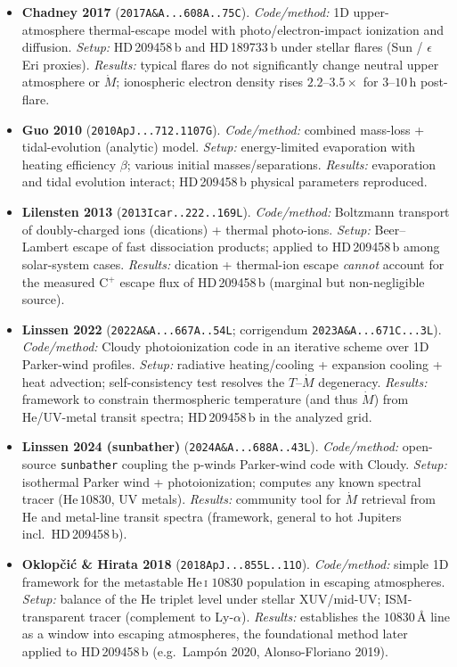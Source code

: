 \begin{itemize}
\item \textbf{Chadney 2017} (\texttt{2017A\&A...608A..75C}).
\emph{Code/method:} 1D upper-atmosphere thermal-escape model with photo/electron-impact ionization and diffusion.
\emph{Setup:} HD\,209458\,b and HD\,189733\,b under stellar flares (Sun / $\epsilon$\,Eri proxies).
\emph{Results:} typical flares do not significantly change neutral upper atmosphere or $\dot M$; ionospheric electron density rises $2.2$--$3.5\times$ for $3$--$10$\,h post-flare.

\item \textbf{Guo 2010} (\texttt{2010ApJ...712.1107G}).
\emph{Code/method:} combined mass-loss + tidal-evolution (analytic) model.
\emph{Setup:} energy-limited evaporation with heating efficiency $\beta$; various initial masses/separations.
\emph{Results:} evaporation and tidal evolution interact; HD\,209458\,b physical parameters reproduced.

\item \textbf{Lilensten 2013} (\texttt{2013Icar..222..169L}).
\emph{Code/method:} Boltzmann transport of doubly-charged ions (dications) + thermal photo-ions.
\emph{Setup:} Beer--Lambert escape of fast dissociation products; applied to HD\,209458\,b among solar-system cases.
\emph{Results:} dication + thermal-ion escape \emph{cannot} account for the measured C$^+$ escape flux of HD\,209458\,b (marginal but non-negligible source).

\item \textbf{Linssen 2022} (\texttt{2022A\&A...667A..54L}; corrigendum \texttt{2023A\&A...671C...3L}).
\emph{Code/method:} Cloudy photoionization code in an iterative scheme over 1D Parker-wind profiles.
\emph{Setup:} radiative heating/cooling + expansion cooling + heat advection; self-consistency test resolves the $T$--$\dot M$ degeneracy.
\emph{Results:} framework to constrain thermospheric temperature (and thus $\dot M$) from He/UV-metal transit spectra; HD\,209458\,b in the analyzed grid.

\item \textbf{Linssen 2024 (sunbather)} (\texttt{2024A\&A...688A..43L}).
\emph{Code/method:} open-source \texttt{sunbather} coupling the p-winds Parker-wind code with Cloudy.
\emph{Setup:} isothermal Parker wind + photoionization; computes any known spectral tracer (He\,$10830$, UV metals).
\emph{Results:} community tool for $\dot M$ retrieval from He and metal-line transit spectra (framework, general to hot Jupiters incl.\ HD\,209458\,b).

\item \textbf{Oklop\v{c}i\'c \& Hirata 2018} (\texttt{2018ApJ...855L..11O}).
\emph{Code/method:} simple 1D framework for the metastable He\,\textsc{i} $10830$ population in escaping atmospheres.
\emph{Setup:} balance of the He triplet level under stellar XUV/mid-UV; ISM-transparent tracer (complement to Ly-$\alpha$).
\emph{Results:} establishes the $10830$\,\AA{} line as a window into escaping atmospheres, the foundational method later applied to HD\,209458\,b (e.g.\ Lamp\'on 2020, Alonso-Floriano 2019).

\end{itemize}

